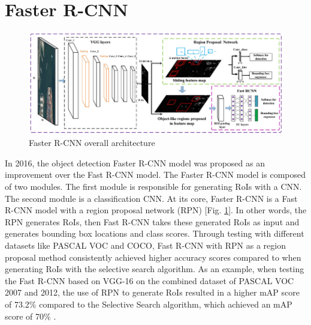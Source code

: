 \section{Faster R-CNN}  \label{sec:faster_rcnn}

\begin{figure}[!ht]
    \centering
    \includegraphics[width=5in]{figures/faster_rcnn_archite.png}
    \caption{Faster R-CNN overall architecture \cite{faster_rcnn_architecture_fig}} \label{fig:faster_rcnn_archite}
\end{figure}

In 2016, the object detection Faster R-CNN model was proposed as an improvement over the Fast R-CNN model. The Faster R-CNN model is composed of two modules. The first module is responsible for generating RoIs with a CNN. The second module is a classification CNN. At its core, Faster R-CNN is a Fast R-CNN model with a region proposal network (RPN) [Fig. \ref{fig:faster_rcnn_archite}]. In other words, the RPN generates RoIs, then Fast R-CNN takes these generated RoIs as input and generates bounding box locations and class scores. Through testing with different datasets like PASCAL VOC and COCO, Fast R-CNN with RPN as a region proposal method consistently achieved higher accuracy scores compared to when generating RoIs with the selective search algorithm. As an example, when testing the Fast R-CNN based on VGG-16 on the combined dataset of PASCAL VOC 2007 and 2012, the use of RPN to generate RoIs resulted in a higher mAP score of 73.2\% compared to the Selective Search algorithm, which achieved an mAP score of 70\% \cite{faster_rcnn_2015}.

